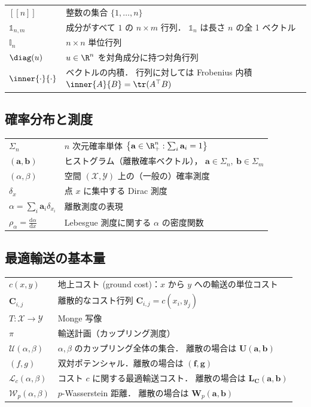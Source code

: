 \begin{tabular}{lp{28em}}
  $[\![ n ]\!]$ & 整数の集合 $\{1, \ldots, n\}$ \\[3pt]
  $\mathbb{1}_{n,m}$ & 成分がすべて $1$ の $n \times m$ 行列．
    $\mathbb{1}_n$ は長さ $n$ の全 1 ベクトル \\[3pt]
  $\mathbb{I}_n$ & $n \times n$ 単位行列 \\[3pt]
  $\diag(u)$ & $u \in \R^n$ を対角成分に持つ対角行列 \\[3pt]
  $\inner{\cdot}{\cdot}$ & ベクトルの内積．
    行列に対しては Frobenius 内積
    $\inner{A}{B} = \tr(A^\top B)$
\end{tabular}

\subsection*{確率分布と測度}

\begin{tabular}{lp{28em}}
  $\Sigma_n$ & $n$ 次元確率単体
    $\bigl\{ \mathbf{a} \in \R^n_+ : \sum_i \mathbf{a}_i = 1 \bigr\}$ \\[3pt]
  $(\mathbf{a}, \mathbf{b})$ & ヒストグラム（離散確率ベクトル），
    $\mathbf{a} \in \Sigma_n,\ \mathbf{b} \in \Sigma_m$ \\[3pt]
  $(\alpha, \beta)$ & 空間 $(\mathcal{X}, \mathcal{Y})$ 上の（一般の）確率測度 \\[3pt]
  $\delta_x$ & 点 $x$ に集中する Dirac 測度 \\[3pt]
  $\alpha = \sum_i \mathbf{a}_i \delta_{x_i}$ & 離散測度の表現 \\[3pt]
  $\rho_\alpha = \frac{\mathrm{d}\alpha}{\mathrm{d}x}$ &
    Lebesgue 測度に関する $\alpha$ の密度関数
\end{tabular}

\subsection*{最適輸送の基本量}

\begin{tabular}{lp{28em}}
  $c(x,y)$ & 地上コスト (ground cost)：$x$ から $y$ への輸送の単位コスト \\[3pt]
  $\mathbf{C}_{i,j}$ & 離散的なコスト行列 $\mathbf{C}_{i,j} = c(x_i, y_j)$ \\[3pt]
  $T : \mathcal{X} \to \mathcal{Y}$ & Monge 写像 \\[3pt]
  $\pi$ & 輸送計画（カップリング測度） \\[3pt]
  $\mathcal{U}(\alpha, \beta)$ &
    $\alpha, \beta$ のカップリング全体の集合．
    離散の場合は $\mathbf{U}(\mathbf{a}, \mathbf{b})$ \\[3pt]
  $(f, g)$ & 双対ポテンシャル．離散の場合は $(\mathbf{f}, \mathbf{g})$ \\[3pt]
  $\mathcal{L}_c(\alpha, \beta)$ &
    コスト $c$ に関する最適輸送コスト．
    離散の場合は $\mathbf{L_C}(\mathbf{a}, \mathbf{b})$ \\[3pt]
  $\mathcal{W}_p(\alpha, \beta)$ &
    $p$-Wasserstein 距離．
    離散の場合は $\mathbf{W}_p(\mathbf{a}, \mathbf{b})$
\end{tabular}

